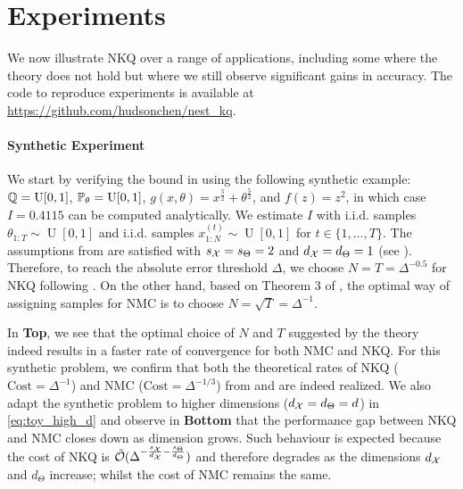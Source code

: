 \section{Experiments}\label{sec:experiments}

We now illustrate NKQ over a range of applications, including some where the theory does not hold but where we still observe significant gains in accuracy. 
The code to reproduce experiments is available at \url{https://github.com/hudsonchen/nest_kq}.


\paragraph{Synthetic Experiment}
We start by verifying the bound in  using the following synthetic example: $\mathbb{Q} = \operatorname{U}[0,1]$, $\mathbb{P}_\theta = \operatorname{U}[0,1]$, $g(x, \theta) = x^{\frac{5}{2}} + \theta^{\frac{5}{2}}$, and $f(z) = z^2$, in which case $I=0.4115$ can be computed analytically. We estimate $I$ with i.i.d. samples $\theta_{1:T} \sim \operatorname{U}[0,1]$ and i.i.d. samples $x_{1:N}^{(t)} \sim \operatorname{U}[0,1]$ for $t \in \{1, \ldots, T\}$.
The assumptions from  are satisfied with $s_{\mathcal{X}} = s_\Theta = 2$ and $d_{\mathcal{X}} = d_\Theta = 1$ (see ).
Therefore, to reach the absolute error threshold $\Delta$, we choose $N = T = \Delta^{-0.5}$ for NKQ  following . 
On the other hand, based on Theorem 3 of \citet{rainforth2018nesting}, the optimal way of assigning samples for NMC is to choose $N = \sqrt{T} = \Delta^{-1}$. 


In  \textbf{Top}, we see that the optimal choice of $N$ and $T$ suggested by the theory indeed results in a faster rate of convergence for both NMC and NKQ. 
For this synthetic problem, we confirm that both the theoretical rates of NKQ ($\text{Cost} = \Delta^{-1}$) and NMC ($\text{Cost} = \Delta^{-1/3}$) from  and \citet[Theorem 3]{rainforth2018nesting} are indeed realized. We also adapt the synthetic problem to higher dimensions ($d_{\mathcal{X}}=d_\Theta=d$) in \eqref{eq:toy_high_d} and observe in  \textbf{Bottom} that the performance gap between NKQ and NMC closes down as dimension grows. 
Such behaviour is expected because the cost of NKQ is $\tilde{\mathcal{O}}(\Delta^{- \frac{ s_{\mathcal{X}}}{d_{\mathcal{X}}} - \frac{ s_\Theta}{d_\Theta}})$ and therefore degrades as the dimensions $d_{\mathcal{X}}$ and $d_\Theta$ increase; whilst the cost of NMC remains the same.

